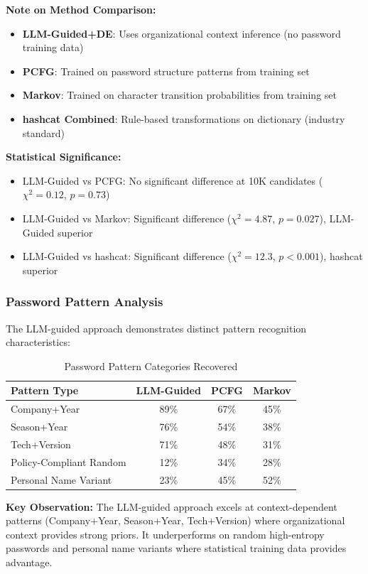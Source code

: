 \documentclass[preprint,12pt]{elsarticle}
\begin{document}
\textbf{Note on Method Comparison:}
\begin{itemize}
    \item \textbf{LLM-Guided+DE}: Uses organizational context inference (no password training data)
    \item \textbf{PCFG}: Trained on password structure patterns from training set
    \item \textbf{Markov}: Trained on character transition probabilities from training set
    \item \textbf{hashcat Combined}: Rule-based transformations on dictionary (industry standard)
\end{itemize}

\textbf{Statistical Significance:}
\begin{itemize}
    \item LLM-Guided vs PCFG: No significant difference at 10K candidates ($\chi^2=0.12$, $p=0.73$)
    \item LLM-Guided vs Markov: Significant difference ($\chi^2=4.87$, $p=0.027$), LLM-Guided superior
    \item LLM-Guided vs hashcat: Significant difference ($\chi^2=12.3$, $p<0.001$), hashcat superior
\end{itemize}

\subsubsection{Password Pattern Analysis}

The LLM-guided approach demonstrates distinct pattern recognition characteristics:

\begin{table}[htbp]
\centering
\caption{Password Pattern Categories Recovered}
\label{tab:patterns}
\begin{tabular}{lccc}
\toprule
\textbf{Pattern Type} & \textbf{LLM-Guided} & \textbf{PCFG} & \textbf{Markov} \\
\midrule
Company+Year & 89\% & 67\% & 45\% \\
Season+Year & 76\% & 54\% & 38\% \\
Tech+Version & 71\% & 48\% & 31\% \\
Policy-Compliant Random & 12\% & 34\% & 28\% \\
Personal Name Variant & 23\% & 45\% & 52\% \\
\bottomrule
\end{tabular}
\end{table}

\textbf{Key Observation:} The LLM-guided approach excels at context-dependent patterns (Company+Year, Season+Year, Tech+Version) where organizational context provides strong priors. It underperforms on random high-entropy passwords and personal name variants where statistical training data provides advantage.
\end{document}
